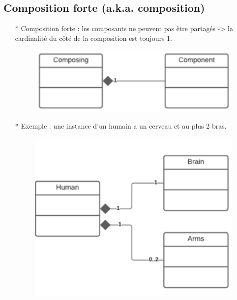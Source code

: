 \documentclass[12pt]{article}
\begin{document}
\subsection{Composition forte (a.k.a. composition)}
\begin{itemize}
	\item[* ] Composition forte : les composants
	ne peuvent pas être partagés -> la cardinalité du
	côté de la composition est toujours 1.
		\begin{figure}[!hbtp]
		\centering
		\includegraphics[scale=0.75]{Capture14.PNG}
	\end{figure}
\item[* ] Exemple : une instance d'un humain a
un cerveau et au plus 2 bras.
	\begin{figure}[!hbtp]
	\centering
	\includegraphics[scale=0.75]{Capture15.PNG}
\end{figure}
\end{itemize}
\end{document}
